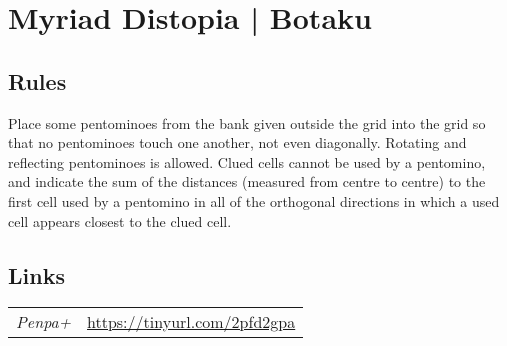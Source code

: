 \section[Myriad Distopia | Botaku {[\emph{Distopia (Partial)}]}]{Myriad Distopia | {\normalfont Botaku}}
\label{sec:53-myriad-distopia-botaku}

\subsection*{Rules}
\begin{markdown}
Place some pentominoes from the bank given outside the grid into the grid so that no pentominoes touch one another, not even diagonally. Rotating and reflecting pentominoes is allowed. Clued cells cannot be used by a pentomino, and indicate the sum of the distances (measured from centre to centre) to the first cell used by a pentomino in all of the orthogonal directions in which a used cell appears closest to the clued cell.
\end{markdown}
\subsection*{Links}
\begin{tabularx}{\textwidth}{l X}
\emph{Penpa+} & \url{https://tinyurl.com/2pfd2gpa} \\
\end{tabularx}
\pagebreak
